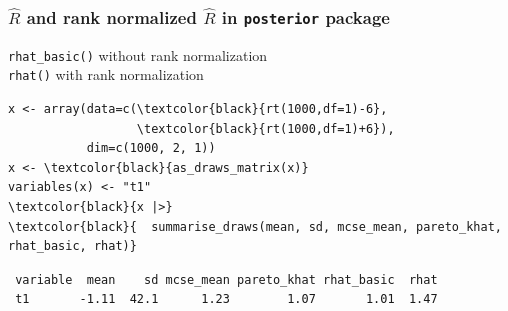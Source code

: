 \documentclass[finnish,english,t]{beamer}
\begin{document}
\begin{frame}[fragile]
  \frametitle{ $\widehat{R}$ and rank normalized $\widehat{R}$ in \texttt{posterior} package}

\texttt{rhat\_basic()} without rank normalization\\
\texttt{rhat()} with rank normalization

{\small
  {\color{gray}
\begin{Verbatim}[commandchars=\\\{\}]
x <- array(data=c(\textcolor{black}{rt(1000,df=1)-6},
                  \textcolor{black}{rt(1000,df=1)+6}),
           dim=c(1000, 2, 1))
x <- \textcolor{black}{as_draws_matrix(x)}
variables(x) <- "t1"
\textcolor{black}{x |>}
\textcolor{black}{  summarise_draws(mean, sd, mcse_mean, pareto_khat, rhat_basic, rhat)}
\end{Verbatim}
}
\pause
\begin{Verbatim}
 variable  mean    sd mcse_mean pareto_khat rhat_basic  rhat
 t1       -1.11  42.1      1.23        1.07       1.01  1.47
\end{Verbatim}
}

\end{frame}

  




\end{document}
